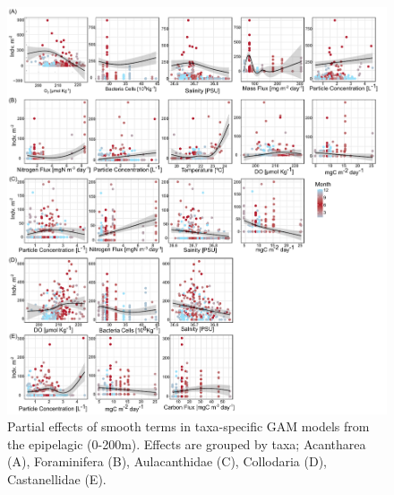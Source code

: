 \documentclass[
]{article}
\begin{document}
\newpage

\begin{figure}

{\centering \includegraphics{images/06_epi-partials.pdf}

}

\caption{Partial effects of smooth terms in taxa-specific GAM models
from the epipelagic (0-200m). Effects are grouped by taxa; Acantharea
(A), Foraminifera (B), Aulacanthidae (C), Collodaria (D), Castanellidae
(E).}

\end{figure}

\newpage
\end{document}
